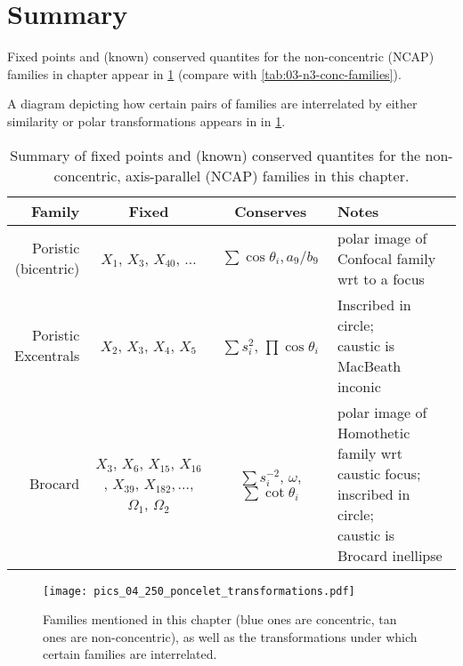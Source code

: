 \section{Summary}

Fixed points and (known) conserved quantites for the non-concentric (NCAP) families in chapter appear in
\cref{tab:04-n3-non-conc-families} (compare with 
\cref{tab:03-n3-conc-families}).

A diagram depicting how certain pairs of families are interrelated by either similarity or polar transformations appears in in \cref{fig:04-transformations}.

\begin{table}
\centering
\begin{tabular}{|r|c|c|l|}
\hline
Family & Fixed & Conserves & Notes \\
\hline
\makecell[rc]{Poristic\\(bicentric)} & $X_1$, $X_3$, $X_{40}$, $\ldots$ & $\sum\cos\theta_i,a_9/b_9$ & \makecell[lc]{polar image of Confocal family\\wrt to a focus} \\
\hline
\makecell[rt]{Poristic\\Excentrals} & $X_2$, $X_3$, $X_4$, $X_5$ & $\sum{s_i^2}$, $\prod\cos\theta_i$ & \makecell[lt]{Inscribed in circle;\\caustic is MacBeath inconic} \\
\hline
Brocard & \makecell[lc]{$X_3$, $X_6$, $X_{15}$, $X_{16}$,\\$X_{39}$, $X_{182},\ldots$,\\$\Omega_1$, $\Omega_2$} & $\sum{s_i^{-2}}$, $\omega$, $\sum\cot\theta_i$ & \makecell[lc]{polar image of Homothetic\\family wrt caustic focus;\\inscribed in circle;\\caustic is Brocard inellipse}\\
\hline
\end{tabular}
\caption{Summary of fixed points and (known) conserved quantites for the non-concentric, axis-parallel (NCAP) families in this chapter.}
\label{tab:04-n3-non-conc-families}
\end{table}

\begin{figure}
    \centering
    \texttt{[image: pics\_04\_250\_poncelet\_transformations.pdf]}
  \caption{Families mentioned in this chapter (blue ones are concentric, tan ones are non-concentric), as well as the transformations under which certain families are interrelated.}
    \label{fig:04-transformations}
\end{figure}